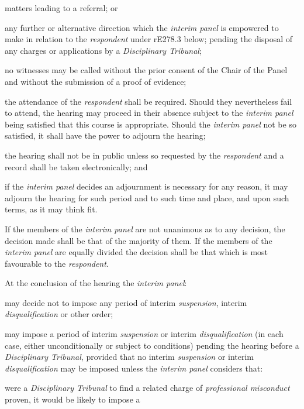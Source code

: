 matters leading to a referral; or\\
\item  any further or alternative direction which the \emph{interim
panel }is empowered to make in relation to the \emph{respondent }under
rE278.3 below;\la
pending the disposal of any charges or applications by
a \emph{Disciplinary Tribunal};\item no witnesses may be called without the prior consent of the Chair of
the Panel and without the submission of a proof of evidence;\item the attendance of the \emph{respondent} shall be required. Should
they nevertheless fail to attend, the hearing may proceed in their
absence subject to the \emph{interim panel} being satisfied that this
course is appropriate. Should the \emph{interim panel} not be so
satisfied, it shall have the power to adjourn the hearing;\item the hearing shall not be in public unless so requested by
the \emph{respondent} and a record shall be taken electronically; and\item if the \emph{interim panel} decides an adjournment is necessary for
any reason, it may adjourn the hearing for such period and to such time
and place, and upon such terms, as it may think fit.\ln
{}\par
If the members of the \emph{interim panel} are not unanimous as to any
decision, the decision made shall be that of the majority of them. If
the members of the \emph{interim panel} are equally divided the decision
shall be that which is most favourable to the \emph{respondent}.\\
\par
At the conclusion of the hearing the \emph{interim panel}:\\\nl \item may decide not to impose any period of interim \emph{suspension},
interim \emph{disqualification} or other order;\item may impose a period of interim \emph{suspension} or
interim \emph{disqualification} (in each case, either unconditionally or
subject to conditions) pending the hearing before a \emph{Disciplinary
Tribunal}, provided that no interim \emph{suspension} or
interim \emph{disqualification} may be imposed unless the \emph{interim
panel }considers that:\al \item were a \emph{Disciplinary Tribunal} to find a related charge
of \emph{professional misconduct} proven, it would be likely to impose a

